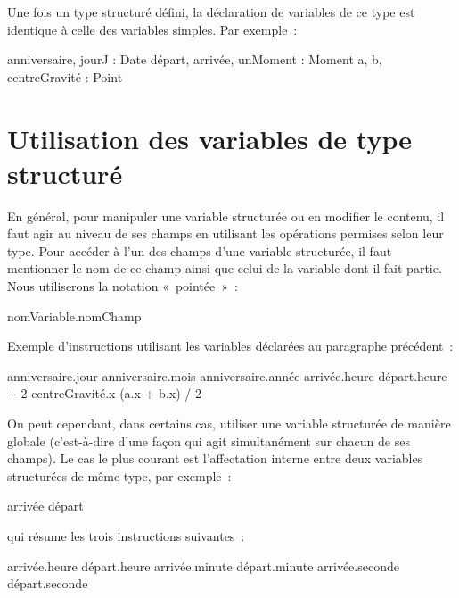 	Une fois un type structuré défini, 
	la déclaration de variables de ce type 
	est identique à celle des variables simples. 
	Par exemple~:

	\begin{Pseudocode}
	\Decl anniversaire, jourJ : Date
	\Decl départ, arrivée, unMoment : Moment
	\Decl a, b, centreGravité : Point
	\end{Pseudocode}

\section{Utilisation des variables de type structuré}

	En général, 
	pour manipuler une variable structurée ou en modifier le contenu, 
	il faut agir au niveau de ses champs en utilisant 
	les opérations permises selon leur type. 
	Pour accéder à l’un des champs d’une variable structurée, 
	il faut mentionner le nom de ce champ 
	ainsi que celui de la variable dont il fait partie.
	Nous utiliserons la notation «~pointée~»~:

	\begin{Pseudocode}
	\Stmt nomVariable.nomChamp
	\end{Pseudocode}

	Exemple d’instructions utilisant les variables
	déclarées au paragraphe précédent~:

	\begin{Pseudocode}
	\Let anniversaire.jour \Gets 15
	\Let anniversaire.mois \Gets 10
	\Let anniversaire.année \Gets 2014
	\Let arrivée.heure \Gets départ.heure + 2
	\Let centreGravité.x \Gets (a.x + b.x) / 2
	\end{Pseudocode}

	On peut cependant, dans certains cas, 
	utiliser une variable structurée de manière globale 
	(c’est-à-dire d’une façon qui agit simultanément sur chacun de ses champs). 
	Le cas le plus courant est l’affectation interne 
	entre deux variables structurées de même type, 
	par exemple~:

	\begin{Pseudocode}
	\Let arrivée \Gets départ
	\end{Pseudocode}

	qui résume les trois instructions suivantes~:

	\begin{Pseudocode}
	\Let arrivée.heure \Gets départ.heure
	\Let arrivée.minute \Gets départ.minute
	\Let arrivée.seconde \Gets départ.seconde
	\end{Pseudocode}

